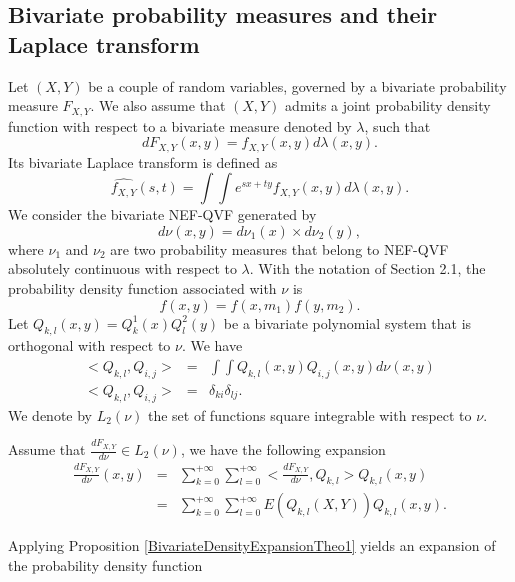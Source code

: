 \subsection{Bivariate probability measures and their Laplace transform}
Let $(X,Y)$ be a couple of random variables, governed by a bivariate probability measure $F_{X,Y}$. We also assume that $(X,Y)$ admits a joint probability density function with respect to a bivariate measure denoted by $\lambda$, such that 
\begin{equation}\label{BivariateProbabilityMeasure}
dF_{X,Y}(x,y)=f_{X,Y}(x,y)d\lambda(x,y).
\end{equation} 
Its bivariate Laplace transform is defined as
\begin{equation}\label{BivariateLaplaceTransform}
\widehat{f_{X,Y}}(s,t)=\int\int e^{sx+ty}f_{X,Y}(x,y)d\lambda(x,y).
\end{equation}
We consider the bivariate NEF-QVF generated by
\begin{equation}\label{NEFQVFBivariateMeasure}
d\nu(x,y)=d\nu_{1}(x)\times d\nu_{2}(y),
\end{equation}
where $\nu_{1}$ and $\nu_{2}$ are two probability measures that belong to NEF-QVF absolutely continuous with respect to $\lambda$. With the notation of Section 2.1, the probability density function associated with $\nu$ is 
\begin{equation}\label{BivariateNEFQVFPDF}
f(x,y)=f(x,m_{1})f(y,m_{2}).
\end{equation}
Let $Q_{k,l}(x,y)=Q_{k}^{1}(x)Q_{l}^{2}(y)$ be a bivariate polynomial system that is orthogonal with respect to $\nu$. We have
\begin{eqnarray*}
<Q_{k,l},Q_{i,j}>&=&\int\int Q_{k,l}(x,y)Q_{i,j}(x,y)d\nu(x,y)\\
<Q_{k,l},Q_{i,j}>&=&\delta_{ki}\delta_{lj}.
\end{eqnarray*}
We denote by $L_{2}(\nu)$ the set of functions square integrable with respect to $\nu$.
\begin{Prop}\label{BivariateDensityExpansionTheo1}
Assume that $\frac{dF_{X,Y}}{d\nu}\in L_{2}(\nu)$, we have the following expansion
\begin{eqnarray}
\frac{dF_{X,Y}}{d\nu}(x,y)&=&\sum_{k=0}^{+\infty}\sum_{l=0}^{+\infty}<\frac{dF_{X,Y}}{d\nu},Q_{k,l}>Q_{k,l}(x,y)\\
&=&\sum_{k=0}^{+\infty}\sum_{l=0}^{+\infty}E(Q_{k,l}(X,Y))Q_{k,l}(x,y).
\end{eqnarray}
\end{Prop}
Applying Proposition \ref{BivariateDensityExpansionTheo1} yields an expansion of the probability density function
